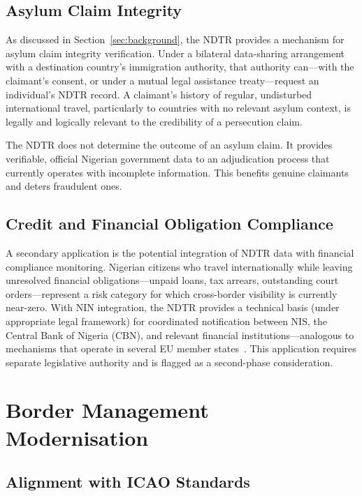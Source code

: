 \documentclass[11pt]{article}
\begin{document}
\subsection{Asylum Claim Integrity}

As discussed in Section~\ref{sec:background}, the NDTR provides
a mechanism for asylum claim integrity verification.
Under a bilateral data-sharing arrangement with a destination country's
immigration authority, that authority can---with the claimant's consent,
or under a mutual legal assistance treaty---request an individual's NDTR
record. A claimant's history of regular, undisturbed international
travel, particularly to countries with no relevant asylum context, is
legally and logically relevant to the credibility of a persecution claim.

The NDTR does not determine the outcome of an asylum claim.
It provides verifiable, official Nigerian government data to
an adjudication process that currently operates with incomplete
information. This benefits genuine claimants and deters fraudulent ones.

\subsection{Credit and Financial Obligation Compliance}

A secondary application is the potential integration of NDTR data
with financial compliance monitoring. Nigerian citizens who travel
internationally while leaving unresolved financial obligations---unpaid
loans, tax arrears, outstanding court orders---represent a risk category
for which cross-border visibility is currently near-zero.
With NIN integration, the NDTR provides a technical basis (under
appropriate legal framework) for coordinated notification between
NIS, the Central Bank of Nigeria (CBN), and relevant financial
institutions---analogous to mechanisms that operate in several
EU member states~\cite{cbn2023}. This application requires
separate legislative authority and is flagged as a second-phase
consideration.

\section{Border Management Modernisation}
\label{sec:border}

\subsection{Alignment with ICAO Standards}
\end{document}
